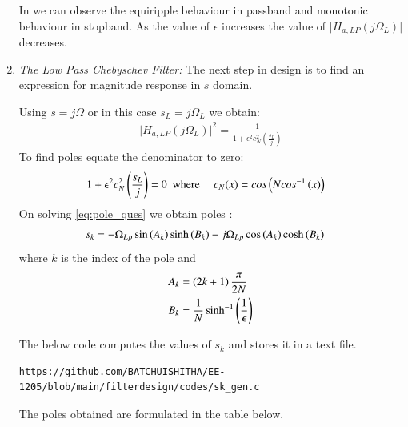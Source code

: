\documentclass{article}
\begin{document}
\begin{enumerate}
In  we can observe the equiripple behaviour in passband and monotonic behaviour in stopband. As the value of $\epsilon$ increases the value of $\vert H_{a,LP}(j\Omega_L)\vert$ decreases.\\

\item {\em The Low Pass Chebyschev Filter:} 
The next step in design is to find an expression for magnitude response in $s$ domain. 

Using $s=j\Omega$ or in this case $s_{L}=j\Omega_{L}$ we obtain:
\begin{align}
    \vert H_{a,LP}(j\Omega_L)\vert^2 = \frac{1}{1 + \epsilon^2c_N^2(\frac{s_L}{j})}
\end{align}
To find poles equate the denominator to zero:
\begin{align}
    {1 + \epsilon^2c_N^2\ensuremath{\left(\frac{s_L}{j}\right)}} &=0\hspace{5pt }
    \text{where } \hspace{10pt} c_N(x) = cos\left(Ncos^{-1}\left(x\right)\right) \label{eq:pole_ques}
\end{align}
On solving \eqref{eq:pole_ques} we obtain poles :
\begin{align}
    s_{k} &= -\Omega_{Lp} \sin\left(A_k\right)\sinh\left(B_k\right) - j\Omega_{Lp}\cos\left(A_k\right)\cosh\left(B_k\right)
\end{align}
where $k$ is the index of the pole and \\
\begin{align}
    A_k &= \left(2k+1\right)\frac{\pi}{2N}\\
    B_k &= \frac{1}{N} \sinh^{-1}\left(\frac{1}{\epsilon}\right)
\end{align}

The below code computes the values of $s_k$ and stores it in a text file. 
\begin{lstlisting}
https://github.com/BATCHUISHITHA/EE-1205/blob/main/filterdesign/codes/sk_gen.c
\end{lstlisting}
The poles obtained are formulated in the table below.



\end{enumerate}
\end{document}
